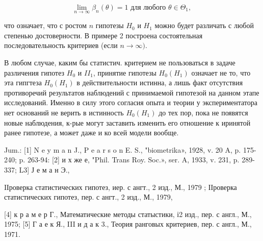 \documentclass[10pt]{article}
\begin{document}
\[

\lim _{n \rightarrow \infty} \beta_{n}(\theta)=1 \text { для любого } \theta \in \Theta_{1} \text {, }

\]



что означает, что с ростом $n$ гипотезы $H_{0}$ и $H_{1}$ можно будет различать с любой степенью достоверности. В примере 2 построена состоятельная последовательность критериев (если $n \rightarrow \infty)$.



В любом случае, каким бы статистич. критерием не пользоваться в задаче различения гипотез $H_{0}$ и $I I_{1}$, принятие гипотезы $H_{0}\left(H_{1}\right)$ означает не то, что эта гипгтеза $H_{0}\left(H_{1}\right)$ в действительности истинна, а лишь факт отсутствия противоречий результатов наблюдений с принимаемой гипотезой на данном этапе исследований. Именно в силу этого согласия опыта и теории у экспериментатора нет оснований не верить в истинность $H_{0}\left(H_{1}\right)$ до тех пор, пока не появятся новые наблюдения, к-рые могут заставить изменить его отношение к иринятой ранее гипотезе, а может даже и ко всей модели вообще.



Jum.: [1] N e y m a n J., P e a r s o n E. S., "biometrika», 1928, v. 20 A, p. 175-240; p. 263-94: [2] и х же е, "Phil. Trans Roy. Soc.», ser. A, 1933, v. 231, p. 289-337; L3] Ј е м а н Э.,

IІроверка статистических гипотез, иер. с ангт., 2 изд., М., 1979 ; ІІроверка статистических гипотез, пер. с ангт., 2 изд., М., 1979,

[4] к р а м е р Г., Математические методы статыстики, і2 изд., пер. с англ., М., 1975; [5] Г а е к Я., III и д а к 3., Теория ранговых критериев, пер. с англ., М., 1971.
\end{document}
